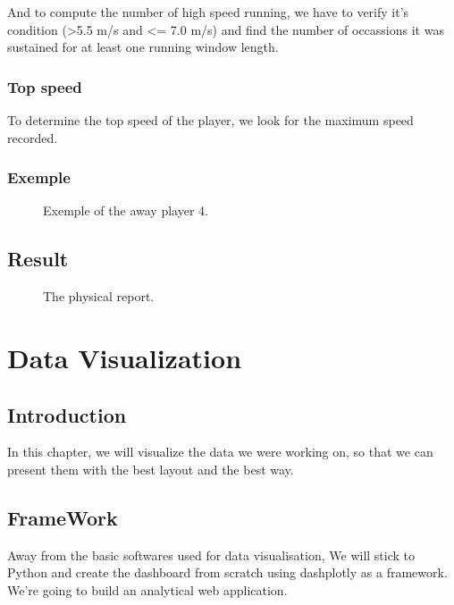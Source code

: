 \documentclass[letterpaper,10pt,english]{jupyterBook}
\begin{document}
\sphinxAtStartPar
And to compute the number of high speed running, we have to verify it’s condition (>5.5 m/s and <= 7.0 m/s) and find the number of occassions it was sustained for at least one running window length.


\subsection{Top speed}
\label{\detokenize{Chap2/chap2:top-speed}}
\sphinxAtStartPar
To determine the top speed of the player, we look for the maximum speed recorded.


\subsection{Exemple}
\label{\detokenize{Chap2/chap2:exemple}}
\begin{figure}[htbp]
\centering
\capstart

\noindent{}
\caption{Exemple of the away player 4.}\label{\detokenize{Chap2/chap2:runexp-fig}}\end{figure}


\section{Result}
\label{\detokenize{Chap2/chap2:result}}
\begin{figure}[htbp]
\centering
\capstart

\noindent{}
\caption{The physical report.}\label{\detokenize{Chap2/chap2:result-fig}}\end{figure}


\chapter{Data Visualization}
\label{\detokenize{Chap3/Chap3:data-visualization}}\label{\detokenize{Chap3/Chap3::doc}}

\section{Introduction}
\label{\detokenize{Chap3/Chap3:introduction}}
\sphinxAtStartPar
In this chapter, we will visualize the data we were working on, so that we can present them with the best layout and the best way.


\section{FrameWork}
\label{\detokenize{Chap3/Chap3:framework}}
\sphinxAtStartPar
Away from the basic softwares used for data visualisation, We will stick to Python and create the dashboard from scratch using dash\sphinxhyphen{}plotly as a framework. We’re going to build an analytical web application.
\end{document}
